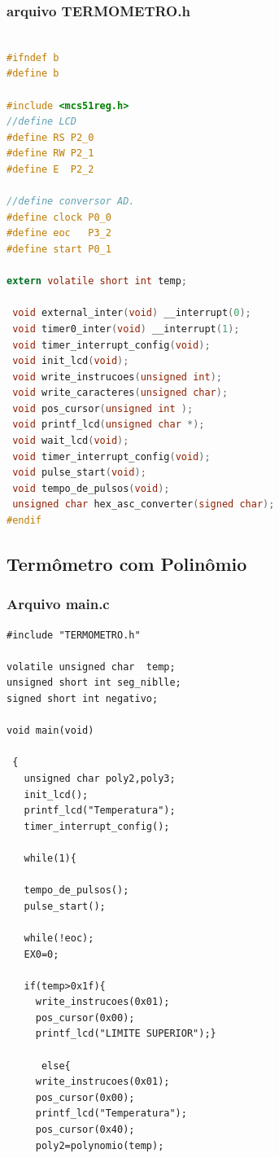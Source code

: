 \documentclass{Fabiano_file}
\begin{document}
{\subsubsection{arquivo TERMOMETRO.h}

\begin{lstlisting}[language=C]

#ifndef b
#define b

#include <mcs51reg.h>
//define LCD
#define RS P2_0
#define RW P2_1
#define E  P2_2

//define conversor AD.
#define clock P0_0
#define eoc   P3_2
#define start P0_1

extern volatile short int temp; 

 void external_inter(void) __interrupt(0);
 void timer0_inter(void) __interrupt(1);
 void timer_interrupt_config(void);
 void init_lcd(void);
 void write_instrucoes(unsigned int);
 void write_caracteres(unsigned char);
 void pos_cursor(unsigned int );
 void printf_lcd(unsigned char *);
 void wait_lcd(void);
 void timer_interrupt_config(void);
 void pulse_start(void);
 void tempo_de_pulsos(void);
 unsigned char hex_asc_converter(signed char);
#endif
\end{lstlisting}

\newpage

\subsection{Termômetro com Polinômio}
\subsubsection{Arquivo main.c}
\begin{lstlisting}
#include "TERMOMETRO.h"

volatile unsigned char  temp; 
unsigned short int seg_niblle;
signed short int negativo;

void main(void)

 {   
   unsigned char poly2,poly3;
   init_lcd();
   printf_lcd("Temperatura");
   timer_interrupt_config();
    
   while(1){

   tempo_de_pulsos();
   pulse_start();

   while(!eoc);
   EX0=0;
   
   if(temp>0x1f){
	 write_instrucoes(0x01);
	 pos_cursor(0x00);
	 printf_lcd("LIMITE SUPERIOR");}
      
      else{
	 write_instrucoes(0x01);
	 pos_cursor(0x00);
	 printf_lcd("Temperatura");
	 pos_cursor(0x40);
	 poly2=polynomio(temp);
	 

\end{lstlisting}}
\end{document}
